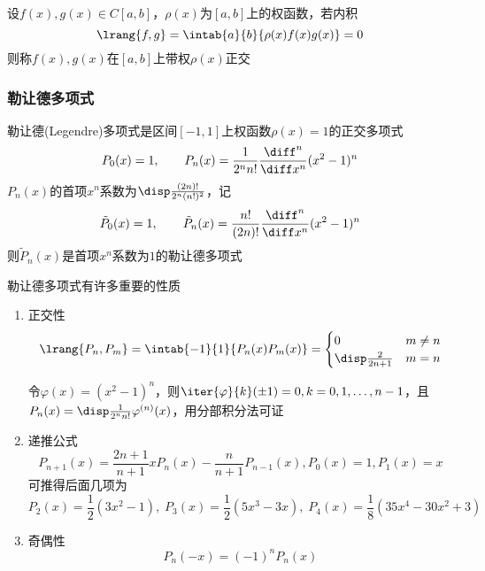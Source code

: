 \begin{definition}[正交]
    设$f(x),g(x)\in C[a,b]$，$\rho(x)$为$[a,b]$上的权函数，若内积
    \[\lrang{f,g}=\intab{a}{b}{\rho(x)f(x)g(x)}=0\]
    则称$f(x),g(x)$在$[a,b]$上带权$\rho(x)$正交
\end{definition}

\subsubsection{勒让德多项式}
勒让德(Legendre)多项式是区间$[-1,1]$上权函数$\rho(x)=1$的正交多项式
\[P_0(x)=1,\qquad P_n(x)=\frac{1}{2^nn!}\frac{\diff^n}{\diff x^n}(x^2-1)^n\]
$P_n(x)$的首项$x^n$系数为$\disp\frac{(2n)!}{2^n(n!)^2}$，记
\[\tilde{P}_0(x)=1,\qquad\tilde{P}_n(x)=\frac{n!}{(2n)!}\frac{\diff^n}{\diff x^n}(x^2-1)^n\]
则$\tilde{P}_n(x)$是首项$x^n$系数为$1$的勒让德多项式

勒让德多项式有许多重要的性质
\begin{enumerate}
    \item 正交性
\[\lrang{P_n,P_m}=\intab{-1}{1}{P_n(x)P_m(x)}=
\begin{cases}
    0&m\ne n\\
    \disp\frac{2}{2n+1}&m=n
\end{cases}\]
\begin{analysis}
    令$\varphi(x)=(x^2-1)^n$，则$\iter{\varphi}{k}(\pm 1)=0,k=0,1,\ldots,n-1$，且$P_n(x)=\disp \frac{1}{2^n n!}\varphi^{(n)}(x)$，用分部积分法可证
\end{analysis}
    \item 递推公式
    \[P_{n+1}(x)=\frac{2n+1}{n+1}xP_n(x)-\frac{n}{n+1}P_{n-1}(x),P_0(x)=1,P_1(x)=x\]
    可推得后面几项为
    \[P_2(x)=\frac{1}{2}(3x^2-1),\;P_3(x)=\frac{1}{2}(5x^3-3x),\;P_4(x)=\frac{1}{8}(35x^4-30x^2+3)\]
    \item 奇偶性
    \[P_n(-x)=(-1)^nP_n(x)\]
\end{enumerate}

